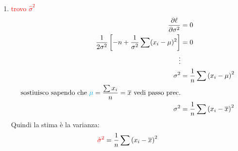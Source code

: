 \documentclass{article}  %
\theoremstyle{definition}
\begin{document}
\begin{esempio}
\begin{enumerate}
\begin{enumerate}
\begin{align*}
				            \dfrac{1}{\sigma^2} \sum x_i - n\mu             & = 0                  \\
				            \frac{\sum x_i - n\mu}{\sigma^2}                & = 0                  \\
				            \sigma^2 \cdot \frac{\sum x_i - n\mu}{\sigma^2} & = \sigma^2 \cdot 0   \\
				            \sum x_i - n\mu                                 & = 0                  \\
				            \mu                                             & = \frac{\sum x_i}{n}
			            \end{align*}
			            Quindi la stima è la media:
			            \begin{align*}
				            \textcolor{red}{\hat{\mu}} = \frac{\sum x_i}{n} = \overline{x}
			            \end{align*}
			      \item \textcolor{red}{trovo $\hat{\sigma}^2$}
			            \begin{align*}
				            \dfrac{\partial \ell}{\partial \sigma^2}                                        & = 0                                                 \\
				            \dfrac{1}{2\sigma^2} \left[ -n + \dfrac{1}{\sigma^2} \sum (x_i - \mu)^2 \right] & = 0                                                 \\
				            \vdots                                                                                                                                \\
				            \sigma^2                                                                        & = \frac{1}{n} \sum \left(x_i- \mu\right)^2          \\
				            \text{sostiuisco sapendo che } \textcolor{cyan}{{\mu}} = \frac{\sum x_i}{n} = \overline{x} \text{ vedi passo prec.}                   \\
				            \sigma^2                                                                        & = \frac{1}{n} \sum \left(x_i- \overline{x}\right)^2 \\
			            \end{align*}
			            Quindi la stima è la varianza:
			            \begin{align*}
				            \textcolor{red}{\hat{\sigma}^2}= \frac{1}{n} \sum \left(x_i- \overline{x}\right)^2
			            \end{align*}

\end{enumerate}
\end{enumerate}
\end{esempio}
\end{document}
